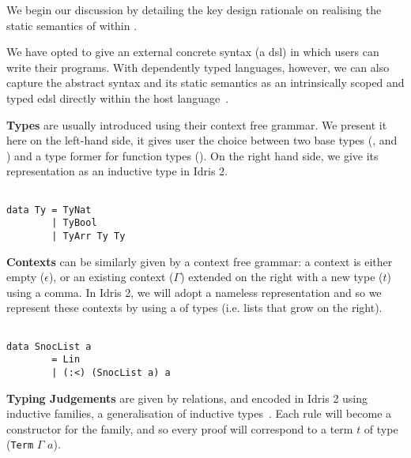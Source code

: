 
We begin our discussion by detailing the key design rationale on
realising the static semantics of \Velo{} within \Idris{}.

We have opted to give \Velo{} an external concrete syntax (a \ac{dsl})
in which users can write their programs.
%
With dependently typed languages, however, we can also capture
the abstract syntax and its static semantics as an intrinsically
scoped and typed \ac{edsl}
directly within the host language~\cite{Augustsson1999edt}.

\textbf{Types} are usually introduced using their context free grammar.
%
We present it here on the left-hand side, it gives user the choice between
two base types (\TyNat, and \TyBool) and a type former for function types
(\TyFunc{\cdot}{\cdot}).
%
On the right hand side, we give its representation as an inductive
type in Idris 2.

\begin{minipage}{0.45\textwidth}
\syntaxtypes
\end{minipage}\hfill
\begin{minipage}{0.45\textwidth}
\begin{Verbatim}

data Ty = TyNat
        | TyBool
        | TyArr Ty Ty
\end{Verbatim}
\end{minipage}

\textbf{Contexts} can be similarly given by a context free grammar:
a context is either empty ($\epsilon$), or an existing context ($\Gamma$)
extended on the right with a new type ($t$) using a comma.
%
In Idris 2, we will adopt a nameless representation and so we represent
these contexts by using a  of types
(i.e. lists that grow on the right).

\begin{minipage}{0.45\textwidth}
\syntaxcontexts
\end{minipage}\hfill
\begin{minipage}{0.45\textwidth}
\begin{Verbatim}

data SnocList a
        = Lin
        | (:<) (SnocList a) a
\end{Verbatim}
\end{minipage}


\textbf{Typing Judgements} are given by relations, and encoded in
Idris 2 using inductive families, a generalisation of inductive
types~\cite{DBLP:journals/fac/Dybjer94}.
%
Each rule will become a constructor for the family, and so every
proof \inferenceRule{} will correspond to a term $t$ of type
(\texttt{Term} $\Gamma$ $a$).

